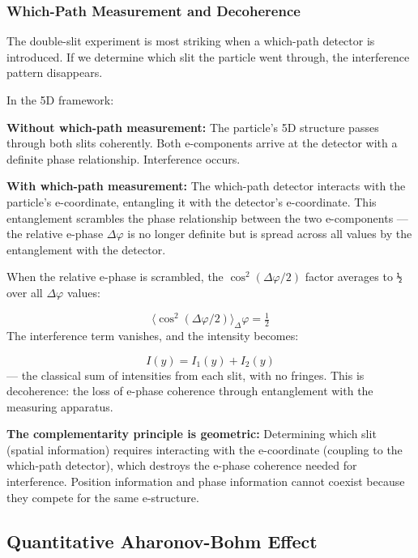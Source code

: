 \documentclass[aps,prd,preprint,superscriptaddress,longbibliography,floatfix]{revtex4-2}
\theoremstyle{remark}
\begin{document}
\subsubsection{Which-Path Measurement and Decoherence}

The double-slit experiment is most striking when a which-path detector is introduced. If we determine which slit the particle went through, the interference pattern disappears.

In the 5D framework:

\textbf{Without which-path measurement:} The particle's 5D structure passes through both slits coherently. Both e-components arrive at the detector with a definite phase relationship. Interference occurs.

\textbf{With which-path measurement:} The which-path detector interacts with the particle's e-coordinate, entangling it with the detector's e-coordinate. This entanglement scrambles the phase relationship between the two e-components --- the relative e-phase $\Delta\varphi$ is no longer definite but is spread across all values by the entanglement with the detector.

When the relative e-phase is scrambled, the $\cos^{2}(\Delta\varphi/2)$ factor averages to \texttt{½} over all $\Delta\varphi$ values:


\begin{equation}
    \langle\cos^2(\Delta\varphi/2)\rangle_\Delta\varphi = \tfrac{1}{2}
\end{equation}
The interference term vanishes, and the intensity becomes:


\begin{equation}
    I(y) = I_{1}(y) + I_{2}(y)
\end{equation}
--- the classical sum of intensities from each slit, with no fringes. This is decoherence: the loss of e-phase coherence through entanglement with the measuring apparatus.

\textbf{The complementarity principle is geometric:} Determining which slit (spatial information) requires interacting with the e-coordinate (coupling to the which-path detector), which destroys the e-phase coherence needed for interference. Position information and phase information cannot coexist because they compete for the same e-structure.



\subsection{Quantitative Aharonov-Bohm Effect}
\end{document}
